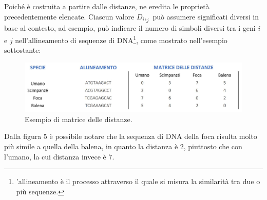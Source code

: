 Poiché è costruita a partire dalle distanze, ne eredita le proprietà precedentemente elencate.
\newline
Ciascun valore $D_i,_j$ può assumere significati diversi in base al contesto, ad esempio, può indicare il numero di simboli diversi tra i geni $i$ e $j$ nell'allineamento di sequenze di DNA\footnote{'allineamento è il processo attraverso il quale si misura la similarità tra due o più sequenze.}, come mostrato nell'esempio sottostante:
\begin{figure}[h!]
	\includegraphics[width=\linewidth]{distance_matrix_example.jpg}
 	\caption{Esempio di matrice delle distanze.}
  	\label{fig:DistanceMatrix}
\end{figure}
\newline
Dalla figura 5 è possibile notare che la sequenza di DNA della foca risulta molto più simile a quella della balena, in quanto la distanza è $2$, piuttosto che con l'umano, la cui distanza invece è $7$.
\newpage

